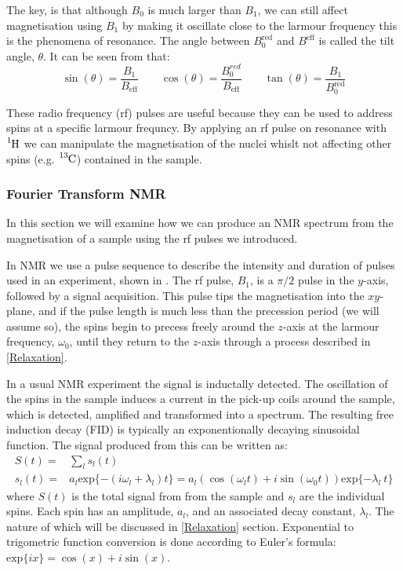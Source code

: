 The key, is that although $B_0$ is much larger than $B_1$, we can still affect magnetisation using $B_1$ by making it oscillate close to the larmour frequency
this is the phenomena of resonance. The angle between $B^{\text{red}}_0$ and $B^{\text{eff}}$ is
called the tilt angle, $\theta$. It can be seen from  that:
\begin{equation}
\sin(\theta) = \frac{B_1}{B_{\text{eff}}}\qquad\cos(\theta) = \frac{B^{red}_0}{B_{\text{eff}}}\qquad\tan(\theta) = \frac{B_1}{B^{\text{red}}_0}
\end{equation}

These radio frequency (rf) pulses are useful because they can be used to address spins at a specific larmour
frequncy. By applying an rf pulse on resonance with $\ce{^1H}$ we can manipulate the magnetisation of the nuclei whislt not affecting other spins (e.g. $\ce{^13C}$) contained in the sample.

\subsubsection{Fourier Transform NMR}

In this section we will examine how we can produce an NMR spectrum from the magnetisation of a sample
using the rf pulses we introduced.

In NMR we use a pulse sequence to describe the intensity and duration of pulses used in an
experiment, shown in . The rf pulse, $B_1$, is a $\pi/2$ pulse in the $y$-axis, followed by a signal
acquisition. This pulse tips the magnetisation into the $xy$-plane, and if the pulse length is much less than the
precession period (we will assume so), the spins begin to precess freely around the $z$-axis at the larmour
frequency, $\omega_0$, until they return to the $z$-axis through a process described in \ref{Relaxation}.

In a usual NMR experiment the signal is inductally detected. The oscillation of the spins in the sample induces
a current in the pick-up coils around the sample, which is detected, amplified and transformed into a spectrum.
The resulting free induction decay (FID) is typically an exponentionally decaying sinusoidal function. The signal
produced from this can be written as:
\begin{align}\label{eqn:signal}
  S(t) =& \sum_l s_l(t) \\
  s_l(t) =& a_l\text{exp}\{-(i\omega_l+\lambda_l)t\} = a_l(\cos(\omega_lt) + i\sin(\omega_0t))\text{exp}\{-\lambda_l~t\}
\end{align}
where $S(t)$ is the total signal from from the sample and $s_l$ are the individual spins. Each spin has an amplitude, $a_l$, and an associated decay constant, $\lambda_l$. The nature of which will be discussed in \ref{Relaxation} section. Exponential to trigometric function conversion
is done according to Euler's formula: $\text{exp}\{ix\} = \cos(x) + i\sin(x)$.

